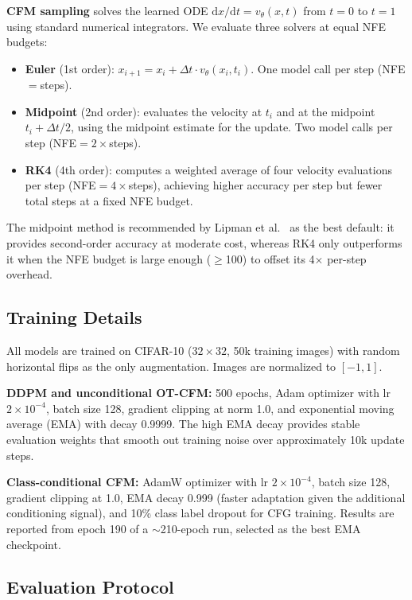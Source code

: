 \documentclass[10pt]{article}
\begin{document}
  \textbf{CFM sampling} solves the learned ODE $\mathrm{d}x/\mathrm{d}t = v_\theta(x, t)$ from $t{=}0$ to $t{=}1$ using standard numerical integrators. We evaluate three solvers at equal NFE
  budgets:
  \begin{itemize}[nosep,leftmargin=*]
      \item \textbf{Euler} (1st order): $x_{i+1} = x_i + \Delta t \cdot v_\theta(x_i, t_i)$. One model call per step (NFE$=$steps).
      \item \textbf{Midpoint} (2nd order): evaluates the velocity at $t_i$ and at the midpoint $t_i + \Delta t/2$, using the midpoint estimate for the update. Two model calls per step
  (NFE$=2\times$steps).
      \item \textbf{RK4} (4th order): computes a weighted average of four velocity evaluations per step (NFE$=4\times$steps), achieving higher accuracy per step but fewer total steps at a fixed NFE
  budget.
  \end{itemize}
  The midpoint method is recommended by Lipman et al.~\cite{lipman2023flow} as the best default: it provides second-order accuracy at moderate cost, whereas RK4 only outperforms it when the NFE
  budget is large enough ($\geq$100) to offset its 4$\times$ per-step overhead.

  \subsection{Training Details}

  All models are trained on CIFAR-10 ($32{\times}32$, 50k training images) with random horizontal flips as the only augmentation. Images are normalized to $[-1, 1]$.

  \textbf{DDPM and unconditional OT-CFM:} 500 epochs, Adam optimizer with lr $2{\times}10^{-4}$, batch size 128, gradient clipping at norm 1.0, and exponential moving average (EMA) with decay
  0.9999. The high EMA decay provides stable evaluation weights that smooth out training noise over approximately 10k update steps.

  \textbf{Class-conditional CFM:} AdamW optimizer with lr $2{\times}10^{-4}$, batch size 128, gradient clipping at 1.0, EMA decay 0.999 (faster adaptation given the additional conditioning signal),
  and 10\% class label dropout for CFG training. Results are reported from epoch 190 of a $\sim$210-epoch run, selected as the best EMA checkpoint.

  \subsection{Evaluation Protocol}
\end{document}
